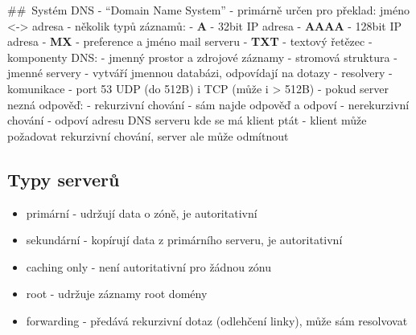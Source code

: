 \documentclass{szzclass}
\providecommand{\tightlist}{%
  \setlength{\itemsep}{0pt}\setlength{\parskip}{0pt}}
\begin{document}

\#\#~Systém DNS - ``Domain Name System'' - primárně určen pro překlad:
jméno \textless-\textgreater{} adresa - několik typů záznamů: -
\textbf{A} - 32bit IP adresa - \textbf{AAAA} - 128bit IP adresa -
\textbf{MX} - preference a jméno mail serveru - \textbf{TXT} - textový
řetězec - komponenty DNS: - jmenný prostor a zdrojové záznamy - stromová
struktura - jmenné servery - vytváří jmennou databázi, odpovídají na
dotazy - resolvery - komunikace - port 53 UDP (do 512B) i TCP (může i
\textgreater{} 512B) - pokud server nezná odpověď: - rekurzivní chování
- sám najde odpověď a odpoví - nerekurzivní chování - odpoví adresu DNS
serveru kde se má klient ptát - klient může požadovat rekurzivní
chování, server ale může odmítnout

\hypertarget{typy-serverux16f}{%
\subsection{Typy serverů}\label{typy-serverux16f}}

\begin{itemize}
\tightlist
\item
  primární - udržují data o zóně, je autoritativní
\item
  sekundární - kopírují data z primárního serveru, je autoritativní
\item
  caching only - není autoritativní pro žádnou zónu
\item
  root - udržuje záznamy root domény
\item
  forwarding - předává rekurzivní dotaz (odlehčení linky), může sám
  resolvovat
\end{itemize}
\end{document}
